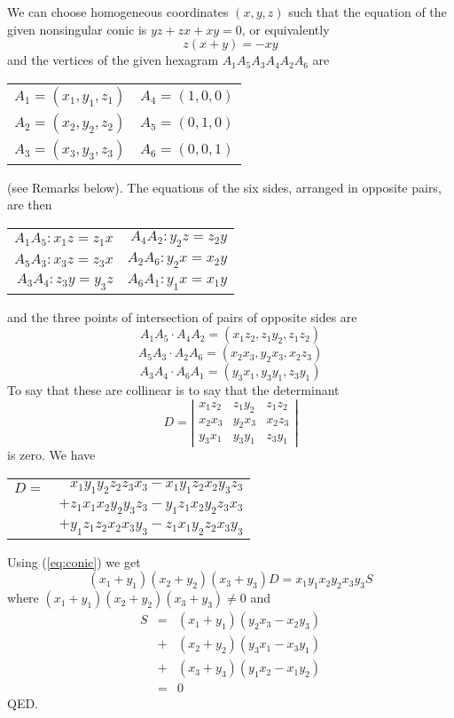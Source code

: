 \documentclass[12pt]{article}
\begin{document}
We can choose homogeneous coordinates $(x,y,z)$ such that the equation
of the given nonsingular conic is $yz+zx+xy=0$, or equivalently
\begin{equation} \label{eq:conic}
z(x+y)=-xy
\end{equation}
and the vertices of the given hexagram $A_1A_5A_3A_4A_2A_6$ are
\begin{center}\begin{tabular}{rr}
$A_1=(x_1,y_1,z_1)$ & $A_4=(1,0,0)$ \\
$A_2=(x_2,y_2,z_2)$ & $A_5=(0,1,0)$ \\
$A_3=(x_3,y_3,z_3)$ & $A_6=(0,0,1)$
\end{tabular}\end{center}
(see Remarks below).
The equations of the six sides, arranged in opposite pairs, are then
\begin{center}\begin{tabular}{rr}
$A_1A_5: x_1z=z_1x$ & $A_4A_2: y_2z=z_2y$ \\
$A_5A_3: x_3z=z_3x$ & $A_2A_6: y_2x=x_2y$ \\
$A_3A_4: z_3y=y_3z$ & $A_6A_1: y_1x=x_1y$
\end{tabular}\end{center}
and the three points of intersection of pairs of opposite sides are
$$A_1A_5\cdot A_4A_2 = (x_1z_2,z_1y_2,z_1z_2)$$
$$A_5A_3\cdot A_2A_6 = (x_2x_3,y_2x_3,x_2z_3)$$
$$A_3A_4\cdot A_6A_1 = (y_3x_1,y_3y_1,z_3y_1)$$
To say that these are collinear is to say that the determinant
$$ D=\left| \begin{array}{ccc}
x_1z_2 & z_1y_2 & z_1z_2 \\
x_2x_3 & y_2x_3 & x_2z_3 \\
y_3x_1 & y_3y_1 & z_3y_1
\end{array}\right| $$
is zero. We have
\begin{center}\begin{tabular}{rr}
$D=$ & $x_1y_1y_2z_2z_3x_3-x_1y_1z_2x_2y_3z_3$ \\
     & $+z_1x_1x_2y_2y_3z_3-y_1z_1x_2y_2z_3x_3$ \\
     & $+y_1z_1z_2x_2x_3y_3-z_1x_1y_2z_2x_3y_3$
\end{tabular}\end{center}
Using (\ref{eq:conic}) we get
$$(x_1+y_1)(x_2+y_2)(x_3+y_3)D=x_1y_1x_2y_2x_3y_3S$$
where $(x_1+y_1)(x_2+y_2)(x_3+y_3)\ne 0$ and
\begin{eqnarray*}
S&= &(x_1+y_1)(y_2x_3-x_2y_3) \\
 & +&(x_2+y_2)(y_3x_1-x_3y_1) \\
 & +&(x_3+y_3)(y_1x_2-x_1y_2) \\
 &= &0
\end{eqnarray*}
QED.
\end{document}
